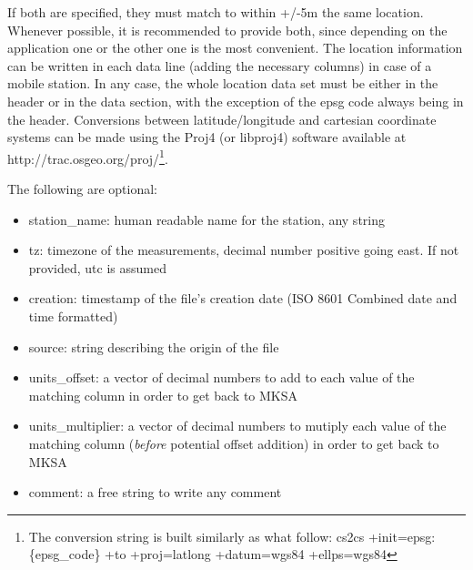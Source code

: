 \documentclass[a4paper,10pt]{article}
\begin{document}
If both are specified, they must match to within +/-5m the same location. Whenever possible, it is recommended to provide both, since depending on the application one or the other one is the most convenient. The location information can be written in each data line (adding the necessary columns) in case of a mobile station. In any case, the whole location data set must be either in the header or in the data section, with the exception of the epsg code always being in the header. Conversions between latitude/longitude and cartesian coordinate systems can be made using the Proj4 (or libproj4) software available at http://trac.osgeo.org/proj/\footnote{The conversion string is built similarly as what follow: cs2cs +init=epsg:\{epsg\_code\} +to +proj=latlong +datum=wgs84 +ellps=wgs84}.

The following are optional:
\begin{itemize}
	\item station\_name: human readable name for the station, any string
	\item tz: timezone of the measurements, decimal number positive going east. If not provided, utc is assumed
	\item creation: timestamp of the file's creation date (ISO 8601 Combined date and time formatted)
	\item source: string describing the origin of the file
	\item units\_offset: a vector of decimal numbers to add to each value of the matching column in order to get back to MKSA
	\item units\_multiplier: a vector of decimal numbers to mutiply each value of the matching column (\emph{before} potential offset addition) in order to get back to MKSA
	\item comment: a free string to write any comment
\end{itemize}
\end{document}
